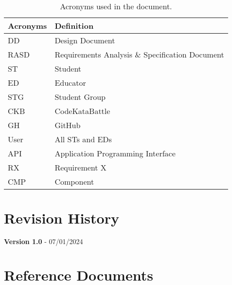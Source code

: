 \begin{table}[H]
    \begin{center}
        \begin{tabular}{ |l|l| }
            \hline
            \textbf{Acronyms} & \textbf{Definition}                              \\
            \hline
            DD             & Design Document                      \\
            \hline            
            RASD             & Requirements Analysis \& Specification Document     \\   
            \hline
            ST              & Student                         \\
            \hline
            ED              & Educator                         \\
            \hline
            STG             & Student Group                    \\
            \hline
            CKB             & CodeKataBattle                   \\
            \hline
            GH              & GitHub                           \\
            \hline
            User            & All STs and EDs                           \\
            \hline
            API             & Application Programming Interface       \\
            \hline
            RX              & Requirement X                           \\
            \hline
            CMP            & Component                           \\
            \hline
         \end{tabular}
        \caption{Acronyms used in the document.}
        \label{tab:acronyms}%
    \end{center}
\end{table}

\section{Revision History}
\label{sec:revision_history}%
\textbf{Version 1.0} - 07/01/2024

\section{Reference Documents}
\label{sec:reference_documents}%

